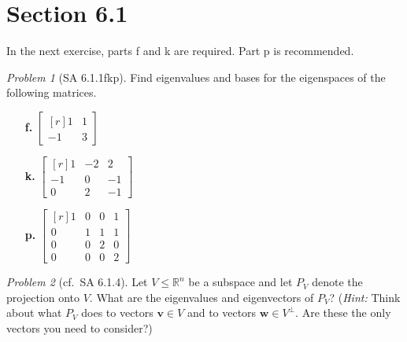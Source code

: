 \documentclass[fleqn,11pt]{paper}
\theoremstyle{remark}
\newtheorem{problem}{Problem}
\newtheorem*{solution}{{\bf Solution}}
\newcommand\R{\fld{R}}
\renewcommand{\vec}[1]{\mathbf{#1}}
\newcommand{\<}{\ensuremath{\langle}}
\renewcommand{\>}{\ensuremath{\rangle}}
\newcommand\fld[1]{\ensuremath{\mathbb{#1}}}
\newcommand\vv{\vec{v}}
\newcommand\vw{\vec{w}}
\begin{document}
\section*{Section 6.1}
\noindent In the next exercise, parts f and k are required. Part p is recommended.
\begin{problem}[SA 6.1.1fkp]
Find eigenvalues and bases for the eigenspaces of the following matrices.
\begin{enumerate}
\item[{\bf f.}] $\begin{bmatrix*}[r]1&1\\-1&3\end{bmatrix*}$
\item[{\bf k.}] $\begin{bmatrix*}[r]1&-2&2\\-1&0&-1\\0&2&-1\end{bmatrix*}$
\item[{\bf p.}] $\begin{bmatrix*}[r]1&0&0&1\\0&1&1&1\\0&0&2&0\\0&0&0&2\end{bmatrix*}$
\end{enumerate}
\end{problem}
\newpage

\begin{problem}[cf.~SA 6.1.4]
Let $V\leq \R^n$ be a subspace and let $P_V$ denote the projection onto $V$.  
What are the eigenvalues and eigenvectors of $P_V$? 
({\it Hint:} Think about what $P_V$ does to vectors $\vv\in V$ and to vectors
$\vw\in V^\bot$. Are these the only vectors you need to consider?)
\end{problem}
\newpage
\end{document}
